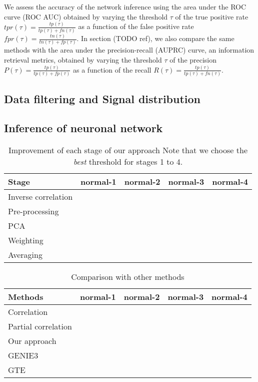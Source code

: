 \documentclass[wcp]{jmlr}
\begin{document}
We assess the accuracy of the network inference using the area under
the ROC curve (ROC AUC) obtained by varying the threshold
$\tau$ of the true positive rate $tpr(\tau) = \frac{tp(\tau)}{tp(\tau) + fn(\tau)}$
as a function of the false positive rate
$fpr(\tau) = \frac{tn(\tau)}{tn(\tau) + fp(\tau)}$. In section (TODO ref),
we also compare the same methods with the area under the precision-recall
(AUPRC) curve, an information retrieval metrics, obtained by varying the threshold
$\tau$ of the precision $P(\tau) = \frac{tp(\tau)}{tp(\tau) + fp(\tau)}$
as a function of the recall $R(\tau) = \frac{tp(\tau)}{tp(\tau) + fn(\tau)}$.


\subsection{Data filtering and Signal distribution}

\subsection{Inference of neuronal network}

\begin{table}[htb]
\centering
\caption{Improvement of each stage of our approach Note that we choose the
         \textit{best} threshold for stages 1 to 4.}
\begin{tabular}{*{5}{l}}
\toprule
Stage               & normal-1 & normal-2 & normal-3 & normal-4 \\
\midrule
Inverse correlation & & & & \\
Pre-processing      & & & & \\
PCA                 & & & & \\
Weighting           & & & & \\
Averaging           & & & & \\
\bottomrule
\end{tabular}
\end{table}


\begin{table}[htb]
\centering
\caption{Comparison with other methods}
\begin{tabular}{*{5}{l}}
\toprule
Methods             & normal-1 & normal-2 & normal-3 & normal-4 \\
\midrule
Correlation         & & & & \\
Partial correlation & & & & \\
Our approach        & & & & \\
GENIE3              & & & & \\
GTE                 & & & & \\
\bottomrule
\end{tabular}
\end{table}
\end{document}
